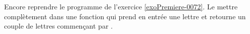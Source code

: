 
\begin{exercice}\label{exoPremiere-0073}

    Encore reprendre le programme de l'exercice \ref{exoPremiere-0072}. Le mettre complètement dans une fonction qui prend en entrée une lettre  et retourne un couple de lettres commençant par .

\end{exercice}
